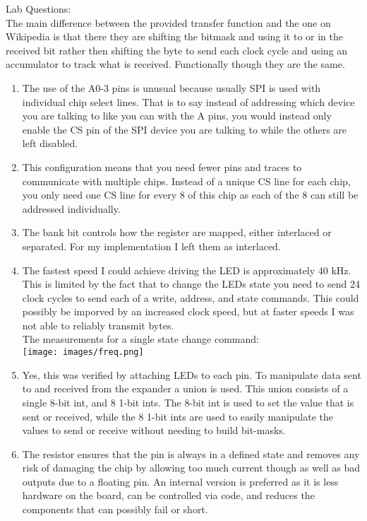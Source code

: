 \documentclass[sigconf]{article}
\begin{document}
Lab Questions: \\
The main difference between the provided transfer function and the one on Wikipedia is that there they are shifting the bitmask and using it to or in the received bit rather then shifting the byte to send each clock cycle and using an accumulator to track what is received. Functionally though they are the same.
\begin{enumerate}
    \item The use of the A0-3 pins is unusual because usually SPI is used with individual chip select lines. That is to say instead of addressing which device you are talking to like you can with the A pins, you would instead only enable the CS pin of the SPI device you are talking to while the others are left disabled.
    \item This configuration means that you need fewer pins and traces to communicate with multiple chips. Instead of a unique CS line for each chip, you only need one CS line for every 8 of this chip as each of the 8 can still be addressed individually.
    \item The bank bit controls how the register are mapped, either interlaced or separated. For my implementation I left them as interlaced.
    \item The fastest speed I could achieve driving the LED is approximately 40 kHz. This is limited by the fact that to change the LEDs state you need to send 24 clock cycles to send each of a write, address, and state commands. This could possibly be imporved by an increased clock speed, but at faster speeds I was not able to reliably transmit bytes. \\
    The measurements for a single state change command: \\
    \texttt{[image: images/freq.png]}
    \item Yes, this was verified by attaching LEDs to each pin. To manipulate data sent to and received from the expander a union is used. This union consists of a single 8-bit int, and 8 1-bit ints. The 8-bit int is used to set the value that is sent or received, while the 8 1-bit ints are used to easily manipulate the values to send or receive without needing to build bit-masks.
    \item The resistor ensures that the pin is always in a defined state and removes any risk of damaging the chip by allowing too much current though as well as bad outputs due to a floating pin. An internal version is preferred as it is less hardware on the board, can be controlled via code, and reduces the components that can possibly fail or short.

\end{enumerate}
\end{document}
